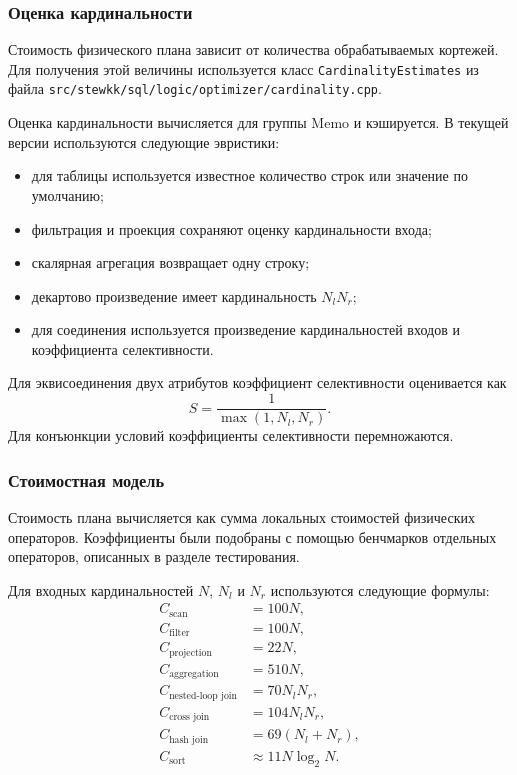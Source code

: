 \documentclass[fontsize=14pt, russian]{scrartcl}
\begin{document}
\subsubsection{Оценка кардинальности}

Стоимость физического плана зависит от количества обрабатываемых кортежей.
Для получения этой величины используется класс
\verb|CardinalityEstimates| из файла
\verb|src/stewkk/sql/logic/optimizer/cardinality.cpp|.

Оценка кардинальности вычисляется для группы Memo и кэшируется. В текущей
версии используются следующие эвристики:
\begin{itemize}
  \item для таблицы используется известное количество строк или значение по
        умолчанию;
  \item фильтрация и проекция сохраняют оценку кардинальности входа;
  \item скалярная агрегация возвращает одну строку;
  \item декартово произведение имеет кардинальность $N_l N_r$;
  \item для соединения используется произведение кардинальностей входов и
        коэффициента селективности.
\end{itemize}

Для эквисоединения двух атрибутов коэффициент селективности оценивается как
\[
  S = \frac{1}{\max(1, N_l, N_r)}.
\]
Для конъюнкции условий коэффициенты селективности перемножаются.

\subsubsection{Стоимостная модель}

Стоимость плана вычисляется как сумма локальных стоимостей физических
операторов. Коэффициенты были подобраны с помощью бенчмарков отдельных
операторов, описанных в разделе тестирования.

Для входных кардинальностей $N$, $N_l$ и $N_r$ используются следующие формулы:
\[
\begin{aligned}
  C_{\text{scan}} &= 100N, \\
  C_{\text{filter}} &= 100N, \\
  C_{\text{projection}} &= 22N, \\
  C_{\text{aggregation}} &= 510N, \\
  C_{\text{nested-loop join}} &= 70N_lN_r, \\
  C_{\text{cross join}} &= 104N_lN_r, \\
  C_{\text{hash join}} &= 69(N_l + N_r), \\
  C_{\text{sort}} &\approx 11N\log_2N.
\end{aligned}
\]
\end{document}
